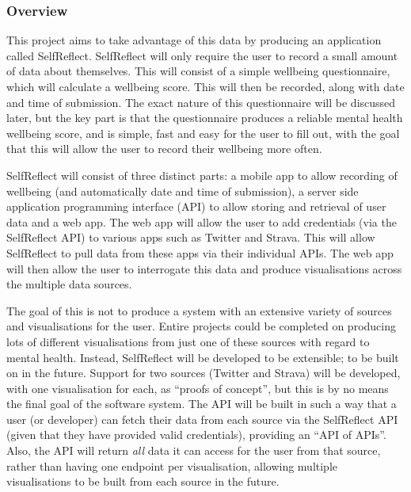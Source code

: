 \documentclass[11pt,openright,a4paper]{report}
\begin{document}
\subsubsection{Overview}
This project aims to take advantage of this data by producing an application called SelfReflect. SelfReflect will only require the user to record a small amount of data about themselves. This will consist of a simple wellbeing questionnaire, which will calculate a wellbeing score. This will then be recorded, along with date and time of submission. The exact nature of this questionnaire will be discussed later, but the key part is that the questionnaire produces a reliable mental health wellbeing score, and is simple, fast and easy for the user to fill out, with the goal that this will allow the user to record their wellbeing more often.

SelfReflect will consist of three distinct parts: a mobile app to allow recording of wellbeing (and automatically date and time of submission), a server side application programming interface (API) to allow storing and retrieval of user data and a web app. The web app will allow the user to add credentials (via the SelfReflect API) to various apps such as Twitter and Strava. This will allow SelfReflect to pull data from these apps via their individual APIs. The web app will then allow the user to interrogate this data and produce visualisations across the multiple data sources.

The goal of this is not to produce a system with an extensive variety of sources and visualisations for the user. Entire projects could be completed on producing lots of different visualisations from just one of these sources with regard to mental health. Instead, SelfReflect will be developed to be extensible; to be built on in the future. Support for two sources (Twitter and Strava) will be developed, with one visualisation for each, as \enquote{proofs of concept}, but this is by no means the final goal of the software system. The API will be built in such a way that a user (or developer) can fetch their data from each source via the SelfReflect API (given that they have provided valid credentials), providing an \enquote{API of APIs}. Also, the API will return \emph{all} data it can access for the user from that source, rather than having one endpoint per visualisation, allowing multiple visualisations to be built from each source in the future.
\end{document}
